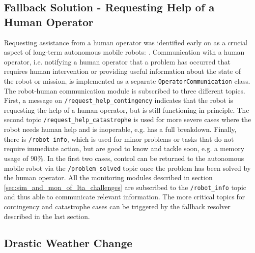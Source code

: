 \documentclass[english, master, utf8]{base/thesis_KBS}
\newcommand{\code}[1]{\colorbox{light-gray}{\texttt{#1}}}
\begin{document}
\subsection{Fallback Solution - Requesting Help of a Human Operator}
\label{sec:fallback_solution}

Requesting assistance from a human operator was identified early on as a crucial aspect of long-term autonomous mobile robots: . \cite{Nourbakhsh:2003}
Communication with a human operator, i.e. notifying a human operator that a problem has occurred that requires human intervention or providing useful information about the state
of the robot or mission, is implemented as a separate \code{OperatorCommunication} class. The robot-human communication module is subscribed to three different topics. First,
a message on \code{/request\_help\_contingency} indicates that the robot is requesting the help of a human operator, but is still functioning in principle. The second topic
\code{/request\_help\_catastrophe} is used for more severe cases where the robot needs human help and is inoperable, e.g. has a full breakdown. Finally, there is \code{/robot\_info},
which is used for minor problems or tasks that do not require immediate action, but are good to know and tackle soon, e.g. a memory usage of $90\%$. In the first two cases, control
can be returned to the autonomous mobile robot via the \code{/problem\_solved} topic once the problem has been solved by the human operator. All the monitoring modules described
in section \ref{sec:sim_and_mon_of_lta_challenges} are subscribed to the \code{/robot\_info} topic and thus able to communicate relevant information. The more critical topics for
contingency and catastrophe cases can be triggered by the fallback resolver described in the last section.

\subsection{Drastic Weather Change}
\label{sec:weather_resolver}
\end{document}
